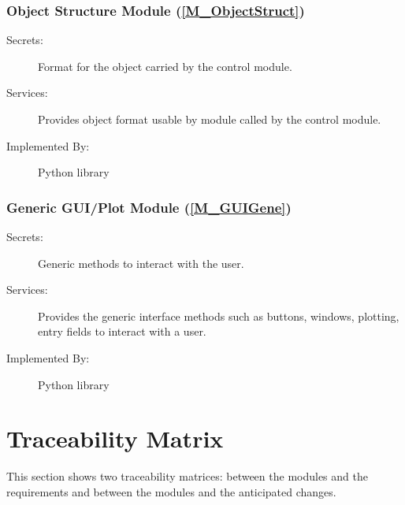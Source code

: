 \documentclass[12pt, titlepage]{article}
\begin{document}
\subsubsection{Object Structure Module 
(\texorpdfstring{\cref{M_ObjectStruct}}))}

\begin{description}
\item[Secrets:] Format for the object carried by the control module.
\item[Services:] Provides object format usable by module called by the control 
module.
\item[Implemented By:] Python library
\end{description}

\subsubsection{Generic GUI/Plot Module (\texorpdfstring{\cref{M_GUIGene}}))}

\begin{description}
\item[Secrets:] Generic methods to interact with the user.
\item[Services:] Provides the generic interface methods such as buttons, 
windows, plotting, entry fields to interact with a user.
\item[Implemented By:] Python library
\end{description}

\section{Traceability Matrix} \label{SecTM}

This section shows two traceability matrices: between the modules and the
requirements and between the modules and the anticipated changes.
\end{document}
